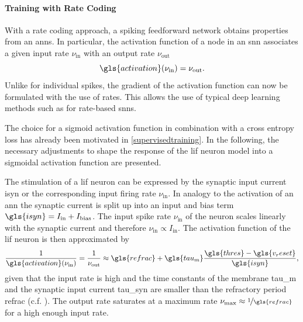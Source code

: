 \paragraph{Training with Rate Coding}
With a rate coding approach, a spiking feedforward network obtains properties from an \glspl{ann}. In particular, the activation function of a node in an \gls{snn} associates a given input rate $\nu_{\text{in}}$ with an output rate $\nu_{\text{out}}$ 
\begin{equation*}
	\gls{activation}(\nu_{\text{in}}) = \nu_\text{out}.
\end{equation*}
Unlike for individual spikes, the gradient of the activation function can now be formulated with the use of rates.  This allows the use of typical deep learning methods such as  for rate-based \glspl{snn}.
 

The choice for a sigmoid activation function in combination with a cross entropy loss has already been motivated in \cref{supervisedtraining}. In the following, the necessary adjustments to shape the response of the \gls{lif} neuron model into a sigmoidal activation function are presented.

The stimulation of a \gls{lif} neuron can be expressed by the synaptic input current \gls{isyn} or the corresponding input firing rate $\nu_\text{in}$. In analogy to the activation of an \gls{ann} the synaptic current is split up into an input and bias term $\gls{isyn} = I_\text{in} + I_\text{bias}$. The input spike rate $\nu_\text{in}$ of the neuron scales linearly with the synaptic current and therefore $\nu_\text{in} \propto I_\text{in}$. The activation function of the \gls{lif} neuron is then approximated by 
\begin{equation}
\frac{1}{\gls{activation}(\nu_\text{in})} = \frac{1}{\nu_\text{out}} \approx \gls{refrac} + \gls{tau_m} \frac{\gls{thres} - \gls{v_reset}}{\gls{isyn}},
\label{fireratehigh}
\end{equation}
given that the input rate is high and the time constants of the membrane \gls{tau_m} and the synaptic input current \gls{tau_syn} are smaller than the refractory period \gls{refrac} (c.f. \citealp{brunel2000dynamics}). The output rate saturates at a maximum rate $\nu_\text{max} \approx \nicefrac{1}{\gls{refrac}}$ for a high enough input rate.

